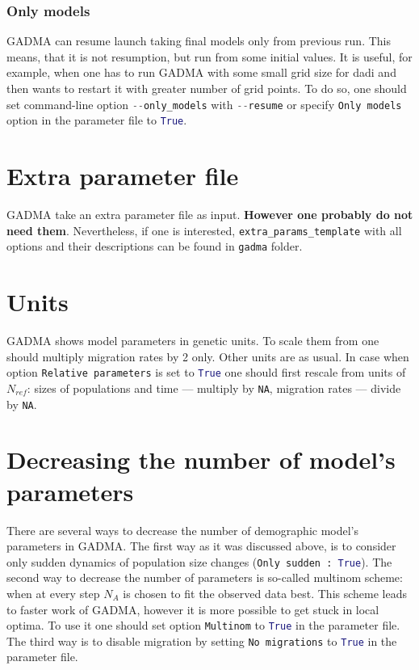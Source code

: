 \documentclass[12pt]{article}
\makeatletter
\newcommand{\py}[1]{\lstinline[language=Python, showstringspaces=False]@#1@}
\makeatother
\begin{document}
\subsubsection{Only models}
GADMA can resume launch taking final models only from previous run. This means, that it is not resumption, but run from some initial values. It is useful, for example, when one has to run GADMA with some small grid size for dadi and then wants to restart it with greater number of grid points. To do so, one should set command-line option \py{--only_models} with \py{--resume} or specify \py{Only models} option in the parameter file to \py{True}.

\section{Extra parameter file}
GADMA take an extra parameter file as input. \textbf{However one probably do not need them}. Nevertheless, if one is interested, \py{extra_params_template} with all options and their descriptions can be found in \py{gadma} folder.

\section{Units}
GADMA shows model parameters in genetic units. To scale them from one should multiply migration rates by 2 only. Other units are as usual. In case when option \py{Relative parameters} is set to \py{True} one should first rescale from units of $N_{ref}$: sizes of populations and time --- multiply by \py{NA}, migration rates --- divide by \py{NA}.

\section{Decreasing the number of model's parameters}
There are several ways to decrease the number of demographic model's parameters in GADMA. The first way as it was discussed above, is to consider only sudden dynamics of population size changes (\py{Only sudden : True}). The second way to decrease the number of parameters is so-called multinom scheme: when at every step $N_A$ is chosen to fit the observed data best. This scheme leads to faster work of GADMA, however it is more possible to get stuck in local optima. To use it one should set option \py{Multinom} to \py{True} in the parameter file. The third way is to disable migration by setting \py{No migrations} to \py{True} in the parameter file.
\end{document}

